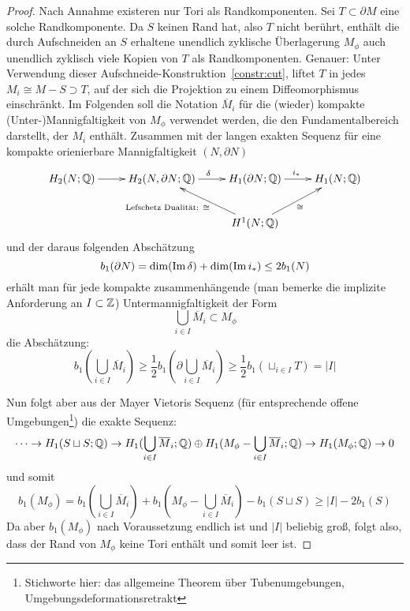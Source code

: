 \begin{proof}
	 Nach Annahme existeren nur Tori als Randkomponenten. Sei $T \subset \partial M$ eine solche Randkomponente. Da $S$ keinen Rand hat, also $T$ nicht berührt, enthält die durch Aufschneiden an $S$ erhaltene unendlich zyklische Überlagerung $M_\phi$ auch unendlich zyklisch viele Kopien von $T$ als Randkomponenten. Genauer: Unter Verwendung dieser Aufschneide-Konstruktion~\ref{constr:cut}, liftet $T$ in jedes $M_i \cong M - S \supset T$, auf der sich die Projektion zu einem Diffeomorphismus einschränkt. Im Folgenden soll die Notation $\overline M_i$ für die (wieder) kompakte (Unter-)Mannigfaltigkeit von $M_\phi$ verwendet werden, die den Fundamentalbereich darstellt, der $M_i$ enthält. Zusammen mit der langen exakten Sequenz für eine kompakte orienierbare Mannigfaltigkeit $(N,\partial N)$
	\[
	 \begin{xy}
	 	\xymatrix{
	 	H_2(N;\QQ) \ar[r]&  H_2(N,\partial N ; \QQ) \ar[r]^\delta & H_1(\partial N;\QQ) \ar[r]^{i_*}& H_1(N;\QQ) \\
	 	& &H^1(N;\QQ) \ar[ru]_{\cong} \ar[lu]^{\text{Lefschetz Dualität: }\cong \qquad~}&}
	 \end{xy}
	 \] 
	 und der daraus folgenden Abschätzung
	 \[
	 	b_1(\partial N) = \dim(\operatorname{Im} \delta) + \dim(\operatorname{Im} i_*) \leq  2b_1(N)
	 \]
	 erhält man für jede kompakte zusammenhängende (man bemerke die implizite Anforderung an $I\subset \mathbb{Z}$) Untermannigfaltigkeit der Form 
	 \[
	  	\bigcup_{i\in I} \overline M_i \subset M_\phi 
	  \]
	  die Abschätzung:
	  \[
	   	b_1(\bigcup_{i\in I} \overline M_i)\geq \frac{1}{2}b_1(\partial \bigcup_{i\in I} \overline M_i) \geq \frac{1}{2}b_1(\sqcup_{i \in I}T) = |I|
	  \]


	 \noindent Nun folgt aber aus der Mayer Vietoris Sequenz (für entsprechende offene Umgebungen\footnote{Stichworte hier: das allgemeine Theorem über Tubenumgebungen, Umgebungsdeformationsretrakt}) die exakte Sequenz:
	  \[
	  	\cdots\to H_1(S\sqcup S;\mathbb{Q}) \to H_1(\bigcup_{i \in I} \overline M_i;\mathbb{Q}) \oplus H_1(M_\phi -\bigcup_{i \in I} \overline M_i;\mathbb{Q}) \to H_1(M_\phi;\mathbb{Q}) \to 0
	  \]
	  und somit
	  \[
	  	b_1(M_\phi)= b_1(\bigcup_{i \in I} \overline M_i)+b_1(M_\phi -\bigcup_{i \in I} \overline M_i)-b_1(S\sqcup S) \geq |I| -2b_1(S)
	  \]
	  Da aber $b_1(M_\phi)$ nach Voraussetzung endlich ist und $|I|$ beliebig groß, folgt also, dass der Rand von $M_\phi$ keine Tori enthält und somit leer ist.


\end{proof}
